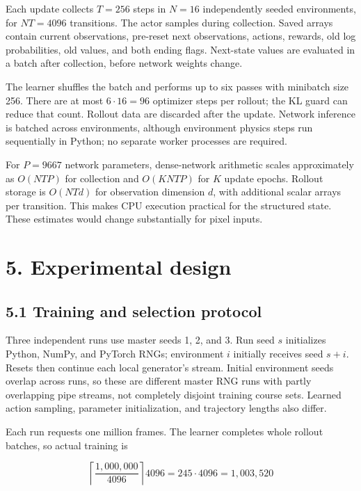 \documentclass[
  11pt,
]{article}
\begin{document}
Each update collects \(T=256\) steps in \(N=16\) independently seeded
environments, for \(NT=4096\) transitions. The actor samples during
collection. Saved arrays contain current observations, pre-reset next
observations, actions, rewards, old log probabilities, old values, and
both ending flags. Next-state values are evaluated in a batch after
collection, before network weights change.

The learner shuffles the batch and performs up to six passes with
minibatch size 256. There are at most \(6\cdot16=96\) optimizer steps
per rollout; the KL guard can reduce that count. Rollout data are
discarded after the update. Network inference is batched across
environments, although environment physics steps run sequentially in
Python; no separate worker processes are required.

For \(P=9667\) network parameters, dense-network arithmetic scales
approximately as \(O(NTP)\) for collection and \(O(KNTP)\) for \(K\)
update epochs. Rollout storage is \(O(NTd)\) for observation dimension
\(d\), with additional scalar arrays per transition. This makes CPU
execution practical for the structured state. These estimates would
change substantially for pixel inputs.

\section{5. Experimental design}\label{experimental-design}

\subsection{5.1 Training and selection
protocol}\label{training-and-selection-protocol}

Three independent runs use master seeds 1, 2, and 3. Run seed \(s\)
initializes Python, NumPy, and PyTorch RNGs; environment \(i\) initially
receives seed \(s+i\). Resets then continue each local generator's
stream. Initial environment seeds overlap across runs, so these are
different master RNG runs with partly overlapping pipe streams, not
completely disjoint training course sets. Learned action sampling,
parameter initialization, and trajectory lengths also differ.

Each run requests one million frames. The learner completes whole
rollout batches, so actual training is

\[
\left\lceil\frac{1{,}000{,}000}{4096}\right\rceil4096
=245\cdot4096=1{,}003{,}520
\]
\end{document}

